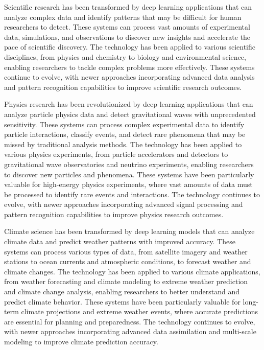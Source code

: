 Scientific research has been transformed by deep learning applications that can analyze complex data and identify patterns that may be difficult for human researchers to detect. These systems can process vast amounts of experimental data, simulations, and observations to discover new insights and accelerate the pace of scientific discovery. The technology has been applied to various scientific disciplines, from physics and chemistry to biology and environmental science, enabling researchers to tackle complex problems more effectively. These systems continue to evolve, with newer approaches incorporating advanced data analysis and pattern recognition capabilities to improve scientific research outcomes.

Physics research has been revolutionized by deep learning applications that can analyze particle physics data and detect gravitational waves with unprecedented sensitivity. These systems can process complex experimental data to identify particle interactions, classify events, and detect rare phenomena that may be missed by traditional analysis methods. The technology has been applied to various physics experiments, from particle accelerators and detectors to gravitational wave observatories and neutrino experiments, enabling researchers to discover new particles and phenomena. These systems have been particularly valuable for high-energy physics experiments, where vast amounts of data must be processed to identify rare events and interactions. The technology continues to evolve, with newer approaches incorporating advanced signal processing and pattern recognition capabilities to improve physics research outcomes.

Climate science has been transformed by deep learning models that can analyze climate data and predict weather patterns with improved accuracy. These systems can process various types of data, from satellite imagery and weather stations to ocean currents and atmospheric conditions, to forecast weather and climate changes. The technology has been applied to various climate applications, from weather forecasting and climate modeling to extreme weather prediction and climate change analysis, enabling researchers to better understand and predict climate behavior. These systems have been particularly valuable for long-term climate projections and extreme weather events, where accurate predictions are essential for planning and preparedness. The technology continues to evolve, with newer approaches incorporating advanced data assimilation and multi-scale modeling to improve climate prediction accuracy.

